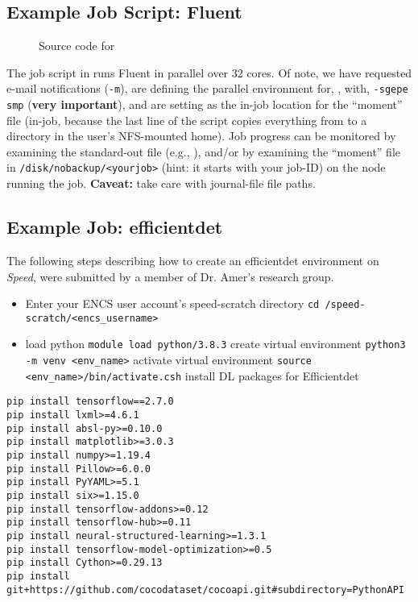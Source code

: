 \documentclass{easychair}
\begin{document}
\subsection{Example Job Script: Fluent}

\begin{figure}[htpb]
    
    \caption{Source code for }
	\label{fig:fluent.sh}
\end{figure}

The job script in  runs Fluent in parallel over 32 cores. 
Of note, we have requested e-mail notifications (\texttt{-m}), are defining the 
parallel environment for, , with, \texttt{-sgepe smp} (\textbf{very 
important}), and are setting  as the in-job location for the
``moment''  file (in-job, because the last line of the script 
copies everything from  to a directory in the user's NFS-mounted home). 
Job progress can be monitored by examining the standard-out file (e.g.,
), and/or by examining the ``moment'' file in 
\texttt{/disk/nobackup/<yourjob>} (hint: it starts with your job-ID) on the node running
the job. \textbf{Caveat:} take care with journal-file file paths.

\subsection{Example Job: efficientdet}

The following steps describing how to create an efficientdet environment on
\emph{Speed}, were submitted by a member of Dr. Amer's research group.

\begin{itemize}
    \item 
    Enter your ENCS user account's speed-scratch directory 
    \verb!cd /speed-scratch/<encs_username>!
    \item
    load python \verb!module load python/3.8.3!
    create virtual environment \verb!python3 -m venv <env_name>!
    activate virtual environment \verb!source <env_name>/bin/activate.csh!
    install DL packages for Efficientdet
\end{itemize}
\begin{verbatim}
pip install tensorflow==2.7.0
pip install lxml>=4.6.1
pip install absl-py>=0.10.0
pip install matplotlib>=3.0.3
pip install numpy>=1.19.4
pip install Pillow>=6.0.0
pip install PyYAML>=5.1
pip install six>=1.15.0
pip install tensorflow-addons>=0.12
pip install tensorflow-hub>=0.11
pip install neural-structured-learning>=1.3.1
pip install tensorflow-model-optimization>=0.5
pip install Cython>=0.29.13
pip install git+https://github.com/cocodataset/cocoapi.git#subdirectory=PythonAPI
\end{verbatim}
\end{document}

